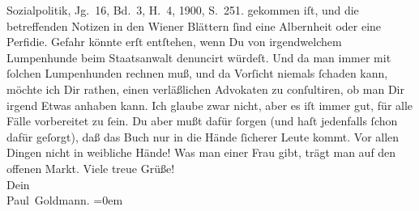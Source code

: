 \begin{ledgroupsized}[t]{13cm}
{{{{                        Sozialpolitik}, Jg. 16, Bd. 3, H. 4, 1900,
                     S. 251.}}}\label{K_L02913-1h} gekommen iſt, und die betreffenden Notizen in den Wiener Blättern ſind eine Albernheit oder eine
               Perfidie. Gefahr könnte erſt entſtehen, wenn Du von irgendwelchem Lumpenhunde beim
                   Staatsanwalt denuncirt würdeſt. Und da man
               immer mit ſolchen Lumpenhunden rechnen muß, und da Vorſicht niemals ſchaden kann, {\pb}möchte ich Dir rathen, einen verläßlichen Advokaten
               zu conſultiren, ob man Dir irgend Etwas anhaben kann. Ich glaube zwar nicht, aber es
               iſt immer gut, für alle Fälle  vorbereitet zu ſein.
               Du aber mußt dafür ſorgen (und haſt jedenfalls ſchon dafür geſorgt), daß das Buch nur in die Hände ſicherer
               Leute kommt. Vor allen  Dingen nicht in weibliche
               Hände! Was man einer Frau gibt, trägt man auf den offenen Markt. \label{K_L02913-2v}\label{K_L02913-2h}\pend
           \pstart
           Viele treue Grüße! {\\[\baselineskip]}Dein {\\[\baselineskip]}\spacefill\mbox{Paul Goldmann.}\pend
           \leftskip=0em{}
         
         \endnumbering{}\end{ledgroupsized}  \newcommand{\dateiname}{L02913}\newcommand{\titel}{Paul Goldmann an Arthur Schnitzler, 27. 4. [1900]}\newcommand{\editorInnen}{Martin Anton Müller und Laura Untner}
      